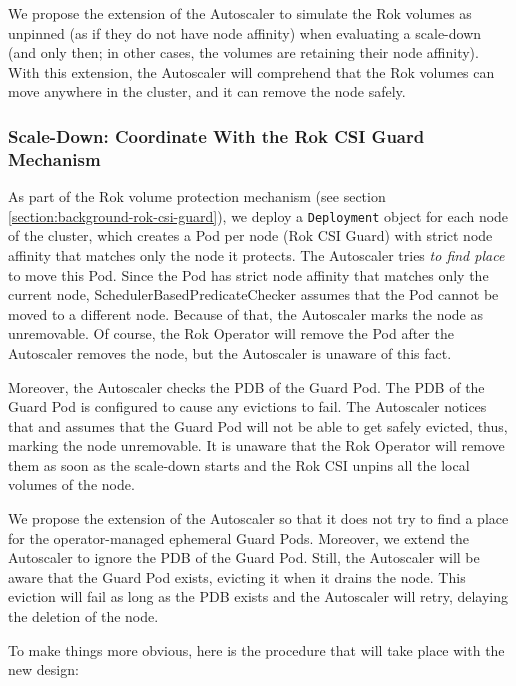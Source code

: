 We propose the extension of the Autoscaler to simulate the Rok volumes as
unpinned (as if they do not have node affinity) when evaluating a scale-down
(and only then; in other cases, the volumes are retaining their node affinity).
With this extension, the Autoscaler will comprehend that the Rok volumes can
move anywhere in the cluster, and it can remove the node safely.

\subsubsection{Scale-Down: Coordinate With the Rok CSI Guard Mechanism}

As part of the Rok volume protection mechanism (see section
\ref{section:background-rok-csi-guard}), we deploy a \texttt{Deployment} object
for each node of the cluster, which creates a Pod per node (Rok CSI Guard)  with
strict node affinity that matches only the node it protects. The Autoscaler
tries \textit{to find place} to move this Pod. Since the Pod has strict node
affinity that matches only the current node, SchedulerBasedPredicateChecker
assumes that the Pod cannot be moved to a different node. Because of that, the
Autoscaler marks the node as unremovable. Of course, the Rok Operator will
remove the Pod after the Autoscaler removes the node, but the Autoscaler is
unaware of this fact.

Moreover,  the Autoscaler checks the PDB of the Guard Pod. The PDB of the Guard
Pod is configured to cause any evictions to fail. The Autoscaler notices that
and assumes that the Guard Pod will not be able to get safely evicted, thus,
marking the node unremovable. It is unaware that the Rok Operator will remove
them as soon as the scale-down starts and the Rok CSI  unpins all the local
volumes of the node.

We propose the extension of the Autoscaler so that it does not try to find a
place for the operator-managed ephemeral Guard Pods. Moreover, we extend the
Autoscaler to ignore the PDB of the Guard Pod. Still, the Autoscaler will be
aware that the Guard Pod exists, evicting it when it drains the node. This
eviction will fail as long as the PDB exists and the Autoscaler will retry,
delaying the deletion of the node.

To make things more obvious, here is the procedure that will take place with the
new design:


